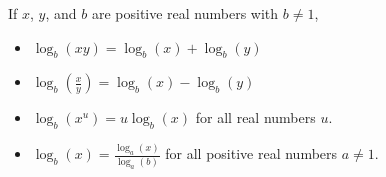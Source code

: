 \documentclass[nooutcomes]{ximera}
\begin{document}
\begin{summary}

If $x$, $y$, and $b$ are positive real numbers with $b \ne 1$,\begin{itemize}
\item $\log_b(xy) = \log_b(x) + \log_b(y)$
\item $\log_b\left(\frac{x}{y}\right) = \log_b(x) - \log_b(y)$
\item $\log_b(x^u) = u\log_b(x)$ for all real numbers $u$. 
\item  $\log_b(x) = \frac{\log_a(x)}{\log_a(b)}$ for all positive real numbers $a \ne 1$. 
\end{itemize}\end{summary}
\end{document}
